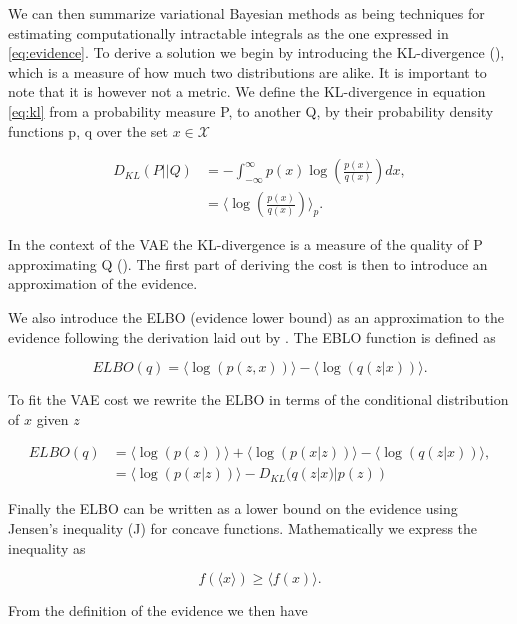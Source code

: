 We can then summarize variational Bayesian methods as being techniques for estimating computationally intractable integrals as the one expressed in \ref{eq:evidence}. To derive a solution we begin by introducing the KL-divergence (\cite{Kullback1951}), which is a measure of how much two distributions are alike. It is important to note that it is however not a metric. We define the KL-divergence in equation \ref{eq:kl} from a probability measure P, to another Q, by their probability density functions p, q over the set $x \in \mathcal{X}$

\begin{align}\label{eq:kl}
D_{KL} (P || Q) &= - \int^{\infty}_{-\infty} p(x) \log \left(\frac{p(x)}{q(x)}\right) dx, \\
&= \langle \log \left(\frac{p(x)}{q(x)} \right)\rangle_{p}.
\end{align}

\noindent In the context of the VAE the KL-divergence is a measure of the quality of P approximating Q (\cite{Burnham2002}). The first part of deriving the cost is then to introduce an approximation of the evidence. 

We also introduce the ELBO (evidence lower bound) as an approximation to the evidence following the derivation laid out by \cite{Kingma2013}. The EBLO function is defined as 

\begin{equation}\label{eq:elbo}
ELBO(q) = \langle \log(p(z, x)) \rangle - \langle \log(q(z|x)) \rangle.
\end{equation}

\noindent To fit the VAE cost we rewrite the ELBO in terms of the conditional distribution of $x$ given $z$

\begin{align}
ELBO(q) &= \langle \log(p(z)) \rangle +  \langle \log(p(x|z)) \rangle - \langle \log(q(z|x)) \rangle, \\
&=   \langle \log(p(x|z)) \rangle - D_{KL}(q(z|x) | p(z))
\end{align}

\noindent Finally the ELBO can be written as a lower bound on the evidence using Jensen's inequality (J) for concave functions. Mathematically we express the inequality as 

\begin{equation}
f(\langle x\rangle) \geq \langle f(x) \rangle.
\end{equation}

\noindent From the definition of the evidence we then have

